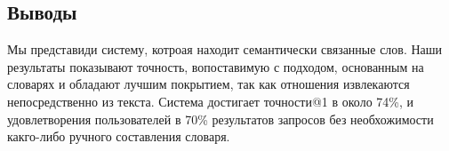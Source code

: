 \documentclass[a4paper,10pt,twoside]{article}
\begin{document}
\subsection{Выводы}

Мы представиди систему, котроая находит семантически связанные слов. Наши результаты показывают точность, вопоставимую с подходом, основанным на словарях и обладают лучшим покрытием, так как отношения извлекаются непосредственно из текста. Система достигает точности@1 в около 74\%, и удовлетворения пользователей в 70\% результатов запросов без необхожимости какго-либо ручного составления словаря.





\end{document}

